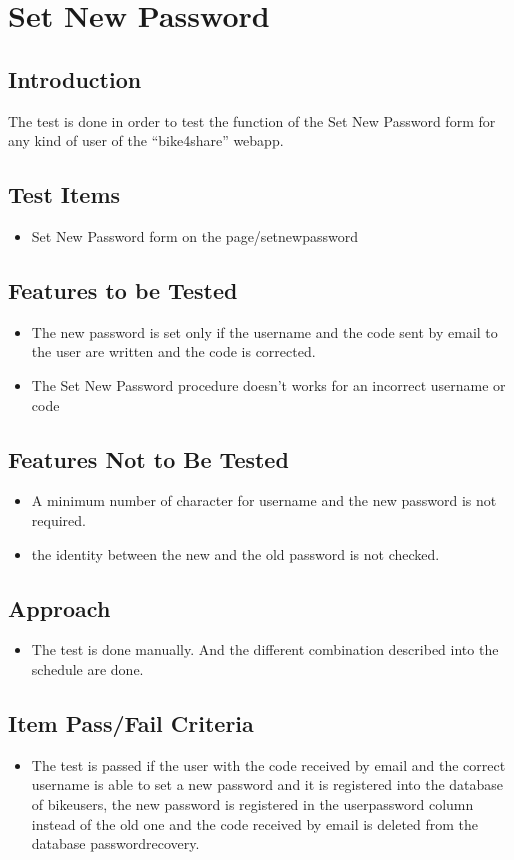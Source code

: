 \documentclass{article}
\begin{document}
\section{Set New Password}
\subsection{Introduction}
The test is done in order to test the function of the Set New Password form for any kind of user of the “bike4share” webapp.
\subsection{Test Items}
\begin{itemize}
    \item Set New Password form on the page/set\textunderscore new\textunderscore password
\end{itemize}
\subsection{Features to be Tested}
\begin{itemize}
    \item The new password is set only if the username and the code sent by email to the user are written and the code is corrected.
    \item The Set New Password procedure doesn’t works for an incorrect username or code  
\end{itemize}
\subsection{Features Not to Be Tested}
\begin{itemize}
    \item A minimum number of character for username and the new password is not required.
    \item the identity between the new and the old password is not checked.
\end{itemize}
\subsection{Approach}
\begin{itemize}
    \item The test is done manually. And the different combination described into the schedule are done. 
\end{itemize}
\subsection{Item Pass/Fail Criteria}
\begin{itemize}
    \item The test is passed if the user with the code received by email and the correct username is able to set a new password and it is registered into the database of bike\textunderscore users, the new password is registered in the user\textunderscore password column instead of the old one and the code received by email is deleted from the database password\textunderscore recovery.
   \end{itemize}
\end{document}
